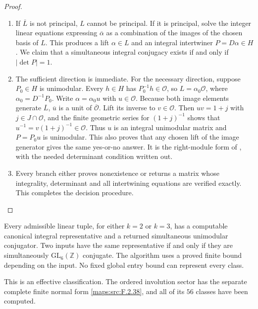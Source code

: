 \begin{proof}
\begin{enumerate}[label={$\langle1\rangle$\arabic*.}]
\item If $\overline L$ is not principal, $L$ cannot be principal. If it is
principal, solve the integer linear equations expressing
$\overline\alpha$ as a combination of the images of the chosen basis
of $L$. This produces a lift $\alpha\in L$ and an integral
intertwiner $P=D\alpha\in H$. We claim that a simultaneous integral
conjugacy exists if and only if $|\det P|=1$.

\item The sufficient direction is immediate. For the necessary direction,
suppose $P_0\in H$ is unimodular. Every $h\in H$ has
$P_0^{-1}h\in\mathcal O$, so
$L=\alpha_0\mathcal O$, where $\alpha_0=D^{-1}P_0$.
Write $\alpha=\alpha_0u$ with $u\in\mathcal O$.
Because both image elements generate $\overline L$,
$\overline u$ is a unit of $\overline{\mathcal O}$.
Lift its inverse to $v\in\mathcal O$. Then $uv=1+j$ with
$j\in J\cap\mathcal O$, and the finite geometric series for
$(1+j)^{-1}$ shows that $u^{-1}=v(1+j)^{-1}\in\mathcal O$.
Thus $u$ is an integral unimodular matrix and
$P=P_0u$ is unimodular. This also proves that any chosen lift of the
image generator gives the same yes-or-no answer. It is the
right-module form of \cite[Theorem 3.4, p.~6; Propositions 8.1--8.2, p.~21]{rootBHJ22},
with the needed determinant condition written out.

\item Every branch either proves nonexistence or returns a matrix whose
integrality, determinant and all intertwining equations are verified
exactly. This completes the decision procedure.

\end{enumerate}
\end{proof}




\begin{theorem}\hypertarget{tag-02NS}{}\label{maps:src:F.2.37}


Every admissible linear tuple, for either $k=2$ or $k=3$,
has a computable canonical integral representative and a
returned simultaneous unimodular conjugator. Two inputs have
the same representative if and only if they are simultaneously
$\mathrm{GL}_6(\mathbb Z)$ conjugate. The algorithm uses a proved
finite bound depending on the input. No fixed global entry bound
can represent every class.

This is an effective classification. The
ordered involution sector has the separate complete finite
normal form \ref{maps:src:F.2.38}, and all of its $56$ classes have been
computed. 

\end{theorem}


